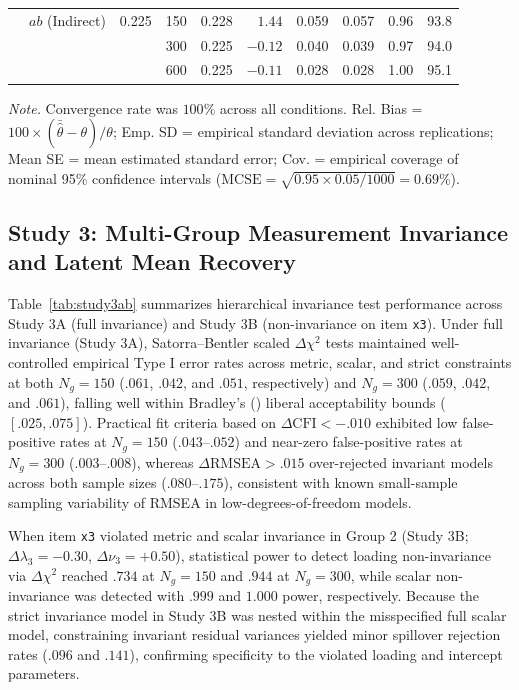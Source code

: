 ﻿\documentclass[12pt,letterpaper]{article}
\begin{document}
\begin{table}[htbp]
\begin{tabular}{llrrrrrrrr}
 & $ab$ (Indirect) & 0.225 & 150 & 0.228 & $1.44$ & 0.059 & 0.057 & 0.96 & 93.8 \\
 & & & 300 & 0.225 & $-0.12$ & 0.040 & 0.039 & 0.97 & 94.0 \\
 & & & 600 & 0.225 & $-0.11$ & 0.028 & 0.028 & 1.00 & 95.1 \\
\bottomrule
\end{tabular}
\vspace{4pt}
\par\noindent\footnotesize\textit{Note.} Convergence rate was $100\%$ across all conditions. Rel. Bias = $100 \times (\bar{\hat{\theta}} - \theta)/\theta$; Emp. SD = empirical standard deviation across replications; Mean SE = mean estimated standard error; Cov. = empirical coverage of nominal 95\% confidence intervals ($\mathrm{MCSE} = \sqrt{0.95 \times 0.05 / 1000} = 0.69\%$).
\end{table}

\subsection{Study 3: Multi-Group Measurement Invariance and Latent Mean Recovery}

Table~\ref{tab:study3ab} summarizes hierarchical invariance test performance across Study 3A (full invariance) and Study 3B (non-invariance on item \texttt{x3}). Under full invariance (Study 3A), Satorra--Bentler scaled $\Delta\chi^2$ tests maintained well-controlled empirical Type I error rates across metric, scalar, and strict constraints at both $N_g = 150$ ($.061$, $.042$, and $.051$, respectively) and $N_g = 300$ ($.059$, $.042$, and $.061$), falling well within Bradley's (\citeyear{bradley1978}) liberal acceptability bounds ($[.025, .075]$). Practical fit criteria based on $\Delta\mathrm{CFI} < -.010$ \parencite{chen2007} exhibited low false-positive rates at $N_g = 150$ ($.043$--$.052$) and near-zero false-positive rates at $N_g = 300$ ($.003$--$.008$), whereas $\Delta\mathrm{RMSEA} > .015$ over-rejected invariant models across both sample sizes ($.080$--$.175$), consistent with known small-sample sampling variability of RMSEA in low-degrees-of-freedom models.

When item \texttt{x3} violated metric and scalar invariance in Group 2 (Study 3B; $\Delta\lambda_3 = -0.30$, $\Delta\nu_3 = +0.50$), statistical power to detect loading non-invariance via $\Delta\chi^2$ reached $.734$ at $N_g = 150$ and $.944$ at $N_g = 300$, while scalar non-invariance was detected with $.999$ and $1.000$ power, respectively. Because the strict invariance model in Study 3B was nested within the misspecified full scalar model, constraining invariant residual variances yielded minor spillover rejection rates ($.096$ and $.141$), confirming specificity to the violated loading and intercept parameters.
\end{document}
